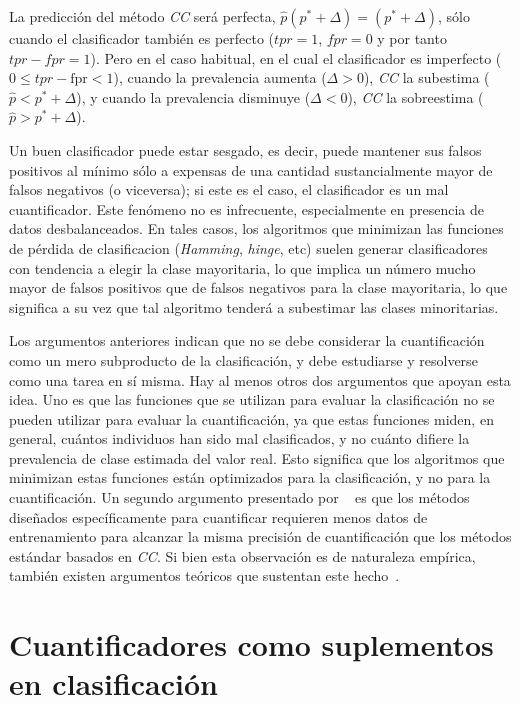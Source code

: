 La predicción del método {\it CC\/} será perfecta, $\hat p(p^* + \Delta) = (p^*
+ \Delta)$, sólo cuando el clasificador también es perfecto (${tpr} = 1$, ${fpr}
= 0$ y por tanto ${tpr} - {fpr} = 1$). Pero en el caso habitual, en el cual el
clasificador es imperfecto ($0 \leq {tpr} - \text {fpr} < 1$), cuando la
prevalencia aumenta ($\Delta > 0$), {\it CC\/} la subestima ($\hat p < p^* +
\Delta $), y cuando la prevalencia disminuye ($\Delta < 0$), {\it CC\/} la
sobreestima ($\hat p > p^* + \Delta $).

Un buen clasificador puede estar sesgado, es decir, puede mantener sus falsos
positivos al mínimo sólo a expensas de una cantidad sustancialmente mayor de
falsos negativos (o viceversa); si este es el caso, el clasificador es un mal
cuantificador. Este fenómeno no es infrecuente, especialmente en presencia de
datos desbalanceados. En tales casos, los algoritmos que minimizan las funciones
de pérdida de clasificacion ({\it Hamming}, {\it hinge}, etc) suelen generar
clasificadores con tendencia a elegir la clase mayoritaria, lo que implica un
número mucho mayor de falsos positivos que de falsos negativos para la clase
mayoritaria, lo que significa a su vez que tal algoritmo tenderá a subestimar
las clases minoritarias.

Los argumentos anteriores indican que no se debe considerar la cuantificación
como un mero subproducto de la clasificación, y debe estudiarse y resolverse
como una tarea en sí misma. Hay al menos otros dos argumentos que apoyan esta
idea. Uno es que las funciones que se utilizan para evaluar la clasificación no
se pueden utilizar para evaluar la cuantificación, ya que estas funciones miden,
en general, cuántos individuos han sido mal clasificados, y no cuánto difiere la
prevalencia de clase estimada del valor real. Esto significa que los algoritmos
que minimizan estas funciones están optimizados para la clasificación, y no para
la cuantificación. Un segundo argumento presentado por
~\citet{forman2008quantifying} es que los métodos diseñados específicamente para
cuantificar requieren menos datos de entrenamiento para alcanzar la misma
precisión de cuantificación que los métodos estándar basados en {\it CC}. Si
bien esta observación es de naturaleza empírica, también existen argumentos
teóricos que sustentan este hecho~\cite{vapnik1999overview}.

\section{Cuantificadores como suplementos en
clasificación}\label{problema:suplementos}

